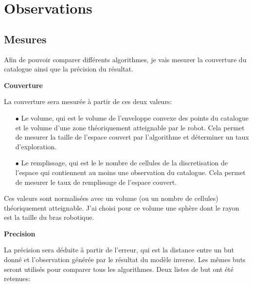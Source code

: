 \documentclass[11pt,french]{report}
\begin{document}
\chapter{Observations}

\section{Mesures}

Afin de pouvoir comparer différents algorithmes, je vais mesurer la couverture du catalogue ainsi que la précision du résultat.

\phantom{INVISIBLE LINE}

\textbf{Couverture}

\phantom{INVISIBLE LINE}

La couverture sera mesurée à partir de ces deux valeurs:

\begin{itemize}
    \item[$\bullet$] Le volume, qui est le volume de l'enveloppe convexe des points du catalogue et le volume d'une zone théoriquement atteignable par le robot.
    Cela permet de mesurer la taille de l'espace couvert par l'algorithme et déterminer un taux d'exploration.
    \item[$\bullet$] Le remplissage, qui est le le nombre de cellules de la discretisation de l'espace qui contiennent au moins une observation du catalogue.
    Cela permet de mesurer le taux de remplissage de l'espace couvert.
\end{itemize}
Ces valeurs sont normalisées avec un volume (ou un nombre de cellules) théoriquement atteignable.
J'ai choisi pour ce volume une sphère dont le rayon est la taille du bras robotique.

\phantom{INVISIBLE LINE}

\textbf{Precision}

\phantom{INVISIBLE LINE}

La précision sera déduite à partir de l'erreur, qui est la distance entre un but donné et l'observation générée par le résultat du modèle inverse.
Les mêmes buts seront utilisés pour comparer tous les algorithmes.
Deux listes de but ont été retenues:
\end{document}
